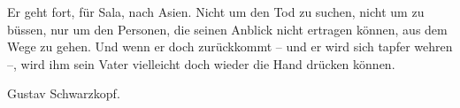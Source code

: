 \pstart
           Er geht fort, für Sala, nach Asien. Nicht um den Tod zu suchen, nicht um zu büssen,
               nur um den Personen, die seinen Anblick nicht ertragen können, aus dem Wege zu gehen.
               Und wenn er doch zurückkommt – und er wird sich tapfer wehren –, wird ihm sein Vater
               vielleicht doch wieder die Hand drücken können.\pend
           
\pstart
           \raggedleft{}Gustav Schwarzkopf.\pend
           \endnumbering{}
\begin{anhang}
\end{anhang}\newcommand{\dateiname}{L04331}\newcommand{\titel}{Gustav Schwarzkopf an Arthur Schnitzler, [10.? 3. 1903]}\newcommand{\editorInnen}{Herausgegeben von Jahnke, SelmaMüller, Martin Anton}
